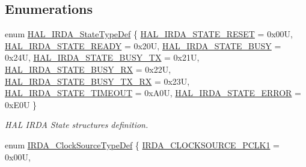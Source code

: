 \subsection*{Enumerations}
\begin{DoxyCompactItemize}
\item 
enum \hyperlink{group___i_r_d_a___exported___types_gab3e65b75c9d4ae39bc50a31222509e1e}{H\+A\+L\+\_\+\+I\+R\+D\+A\+\_\+\+State\+Type\+Def} \{ \newline
\hyperlink{group___i_r_d_a___exported___types_ggab3e65b75c9d4ae39bc50a31222509e1eaa004e82e1ca1d36b3dc84cf9441954dd}{H\+A\+L\+\_\+\+I\+R\+D\+A\+\_\+\+S\+T\+A\+T\+E\+\_\+\+R\+E\+S\+ET} = 0x00U, 
\hyperlink{group___i_r_d_a___exported___types_ggab3e65b75c9d4ae39bc50a31222509e1ea9bf218291b1a5ffe624b5a8f891f6244}{H\+A\+L\+\_\+\+I\+R\+D\+A\+\_\+\+S\+T\+A\+T\+E\+\_\+\+R\+E\+A\+DY} = 0x20U, 
\hyperlink{group___i_r_d_a___exported___types_ggab3e65b75c9d4ae39bc50a31222509e1ea637e8c6b87e1a3a02616c02a68d781f1}{H\+A\+L\+\_\+\+I\+R\+D\+A\+\_\+\+S\+T\+A\+T\+E\+\_\+\+B\+U\+SY} = 0x24U, 
\hyperlink{group___i_r_d_a___exported___types_ggab3e65b75c9d4ae39bc50a31222509e1ea3d8ec588510a501071df3e3d332f9536}{H\+A\+L\+\_\+\+I\+R\+D\+A\+\_\+\+S\+T\+A\+T\+E\+\_\+\+B\+U\+S\+Y\+\_\+\+TX} = 0x21U, 
\newline
\hyperlink{group___i_r_d_a___exported___types_ggab3e65b75c9d4ae39bc50a31222509e1ea1df28c166fea4a3a0cab0f1b9fc4dfbc}{H\+A\+L\+\_\+\+I\+R\+D\+A\+\_\+\+S\+T\+A\+T\+E\+\_\+\+B\+U\+S\+Y\+\_\+\+RX} = 0x22U, 
\hyperlink{group___i_r_d_a___exported___types_ggab3e65b75c9d4ae39bc50a31222509e1eaad510b2da75a1fa39f5ed1d33472a634}{H\+A\+L\+\_\+\+I\+R\+D\+A\+\_\+\+S\+T\+A\+T\+E\+\_\+\+B\+U\+S\+Y\+\_\+\+T\+X\+\_\+\+RX} = 0x23U, 
\hyperlink{group___i_r_d_a___exported___types_ggab3e65b75c9d4ae39bc50a31222509e1ea91524b40055b5b8d642867e4034cfa2f}{H\+A\+L\+\_\+\+I\+R\+D\+A\+\_\+\+S\+T\+A\+T\+E\+\_\+\+T\+I\+M\+E\+O\+UT} = 0x\+A0U, 
\hyperlink{group___i_r_d_a___exported___types_ggab3e65b75c9d4ae39bc50a31222509e1eae2e4e8686446bed256ead393fdb34d67}{H\+A\+L\+\_\+\+I\+R\+D\+A\+\_\+\+S\+T\+A\+T\+E\+\_\+\+E\+R\+R\+OR} = 0x\+E0U
 \}\begin{DoxyCompactList}\small\item\em H\+AL I\+R\+DA State structures definition. \end{DoxyCompactList}
\item 
enum \hyperlink{group___i_r_d_a___exported___types_gaf4d65f54c7cd653d07b5f7af1df6c6c7}{I\+R\+D\+A\+\_\+\+Clock\+Source\+Type\+Def} \{ \newline
\hyperlink{group___i_r_d_a___exported___types_ggaf4d65f54c7cd653d07b5f7af1df6c6c7a85af6ca86d99b52da331bcae6f547761}{I\+R\+D\+A\+\_\+\+C\+L\+O\+C\+K\+S\+O\+U\+R\+C\+E\+\_\+\+P\+C\+L\+K1} = 0x00U, 

\end{DoxyCompactItemize}
